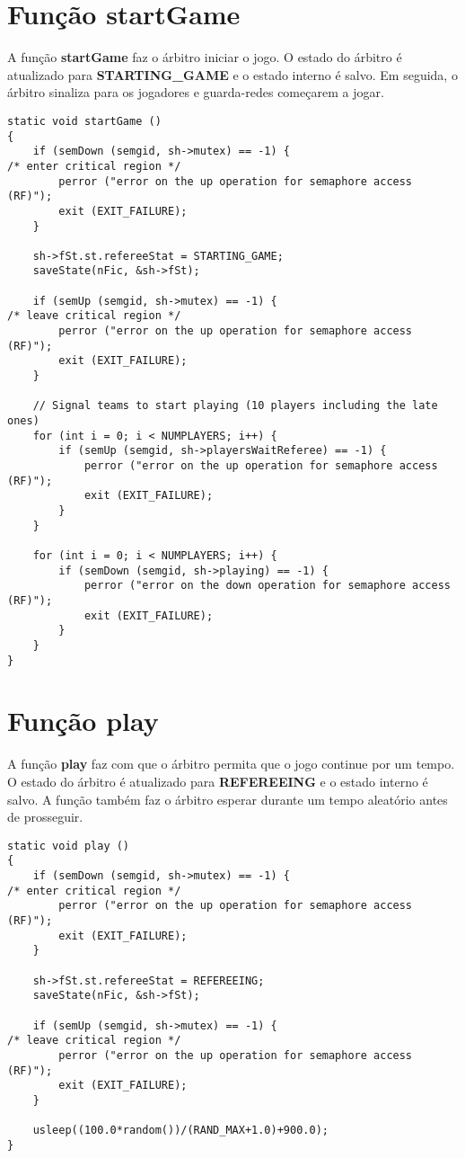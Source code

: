 \documentclass[code,math]{relatorio-deti}
\begin{document}
\section{Função \textbf{startGame}}

A função \textbf{startGame} faz o árbitro iniciar o jogo. O estado do árbitro é atualizado para \textbf{STARTING\_GAME} e o estado interno é salvo. Em seguida, o árbitro sinaliza para os jogadores e guarda-redes começarem a jogar.

\begin{verbatim}
static void startGame ()
{
    if (semDown (semgid, sh->mutex) == -1) {                                                      /* enter critical region */
        perror ("error on the up operation for semaphore access (RF)");
        exit (EXIT_FAILURE);
    }

    sh->fSt.st.refereeStat = STARTING_GAME;
    saveState(nFic, &sh->fSt);    

    if (semUp (semgid, sh->mutex) == -1) {                                                        /* leave critical region */
        perror ("error on the up operation for semaphore access (RF)");
        exit (EXIT_FAILURE);
    }

    // Signal teams to start playing (10 players including the late ones)
    for (int i = 0; i < NUMPLAYERS; i++) {
        if (semUp (semgid, sh->playersWaitReferee) == -1) {
            perror ("error on the up operation for semaphore access (RF)");
            exit (EXIT_FAILURE);
        }
    }

    for (int i = 0; i < NUMPLAYERS; i++) {
        if (semDown (semgid, sh->playing) == -1) {
            perror ("error on the down operation for semaphore access (RF)");
            exit (EXIT_FAILURE);
        }
    }
}
\end{verbatim}

\section{Função \textbf{play}}

A função \textbf{play} faz com que o árbitro permita que o jogo continue por um tempo. O estado do árbitro é atualizado para \textbf{REFEREEING} e o estado interno é salvo. A função também faz o árbitro esperar durante um tempo aleatório antes de prosseguir.

\begin{verbatim}
static void play ()
{
    if (semDown (semgid, sh->mutex) == -1) {                                                      /* enter critical region */
        perror ("error on the up operation for semaphore access (RF)");
        exit (EXIT_FAILURE);
    }

    sh->fSt.st.refereeStat = REFEREEING;
    saveState(nFic, &sh->fSt);

    if (semUp (semgid, sh->mutex) == -1) {                                                        /* leave critical region */
        perror ("error on the up operation for semaphore access (RF)");
        exit (EXIT_FAILURE);
    }

    usleep((100.0*random())/(RAND_MAX+1.0)+900.0);
}
\end{verbatim}
\end{document}
